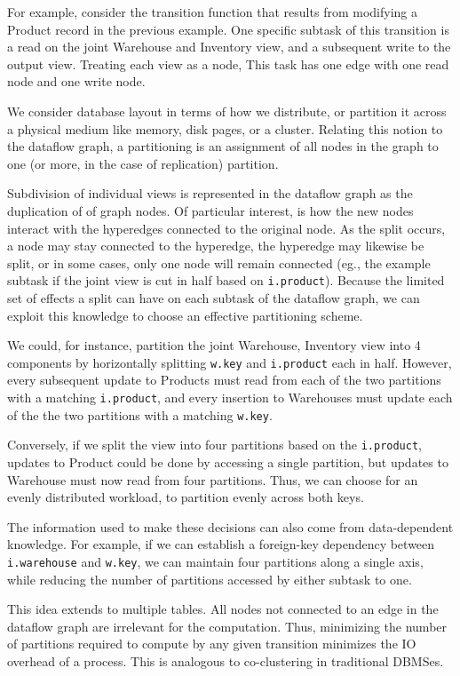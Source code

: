 For example, consider the transition function that results from modifying a Product record in the previous example.  One specific subtask of this transition is a read on the joint Warehouse and Inventory view, and a subsequent write to the output view.  Treating each view as a node, This task has one edge with one read node and one write node.  

We consider database layout in terms of how we distribute, or partition it across a physical medium like memory, disk pages, or a cluster.  Relating this notion to the dataflow graph, a partitioning is an assignment of all nodes in the graph to one (or more, in the case of replication) partition.  

Subdivision of individual views is represented in the dataflow graph as the duplication of  of graph nodes.  Of particular interest, is how the new nodes interact with the hyperedges connected to the original node.  As the split occurs, a node may stay connected to the hyperedge, the hyperedge may likewise be split, or in some cases, only one node will remain connected (eg., the example subtask if the joint view is cut in half based on \texttt{i.product}).  Because the limited set of effects a split can have on each subtask of the dataflow graph, we can exploit this knowledge to choose an effective partitioning scheme.

We could, for instance, partition the joint Warehouse, Inventory view into 4 components by horizontally splitting \texttt{w.key} and \texttt{i.product} each in half.  However, every subsequent update to Products must read from each of the two partitions with a matching \texttt{i.product}, and every insertion to Warehouses must update each of the the two partitions with a matching \texttt{w.key}.  

Conversely, if we split the view into four partitions based on the \texttt{i.product}, updates to Product could be done by accessing a single partition, but updates to Warehouse must now read from four partitions.  Thus, we can choose for an evenly distributed workload, to partition evenly across both keys.

The information used to make these decisions can also come from data-dependent knowledge.  For example, if we can establish a foreign-key dependency between \texttt{i.warehouse} and \texttt{w.key}, we can maintain four partitions along a single axis, while reducing the number of partitions accessed by either subtask to one.

This idea extends to multiple tables.  All nodes not connected to an edge in the dataflow graph are irrelevant for the computation.  Thus, minimizing the number of partitions required to compute by any given transition minimizes the IO overhead of a process.  This is analogous to co-clustering in traditional DBMSes.


